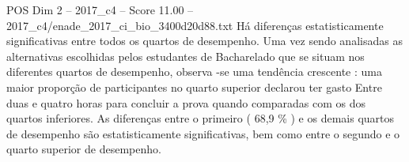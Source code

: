 \begin{textsample}{POS Dim 2 – 2017\_c4 – Score 11.00 – 2017\_c4/enade\_2017\_ci\_bio\_3400d20d88.txt}
Há diferenças estatisticamente significativas entre todos os quartos de desempenho.
Uma vez sendo analisadas as alternativas escolhidas pelos estudantes de Bacharelado que se situam nos diferentes quartos de desempenho, observa -se uma tendência crescente : uma maior proporção de participantes no quarto superior declarou ter gasto Entre duas e quatro horas para concluir a prova quando comparadas com os dos quartos inferiores.
As diferenças entre o primeiro ( 68,9 \% ) e os demais quartos de desempenho são estatisticamente significativas, bem como entre o segundo e o quarto superior de desempenho.

\end{textsample}
